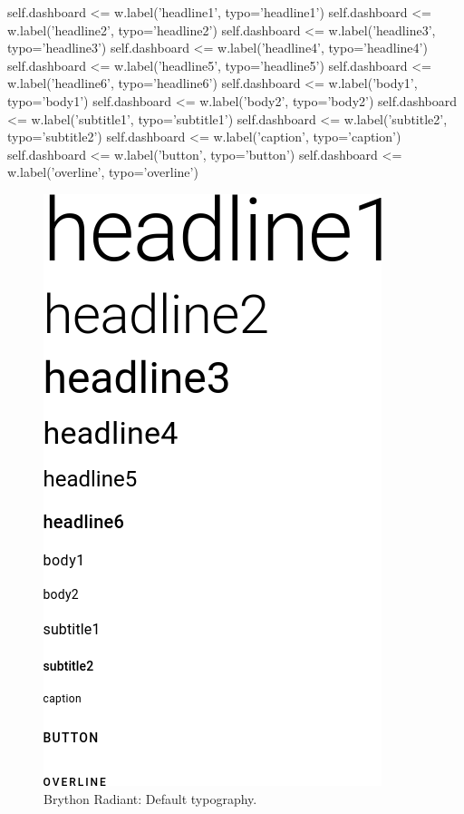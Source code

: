 \begin{python}
self.dashboard <= w.label('headline1', typo='headline1')
self.dashboard <= w.label('headline2', typo='headline2')
self.dashboard <= w.label('headline3', typo='headline3')
self.dashboard <= w.label('headline4', typo='headline4')
self.dashboard <= w.label('headline5', typo='headline5')
self.dashboard <= w.label('headline6', typo='headline6')
self.dashboard <= w.label('body1', typo='body1')
self.dashboard <= w.label('body2', typo='body2')
self.dashboard <= w.label('subtitle1', typo='subtitle1')
self.dashboard <= w.label('subtitle2', typo='subtitle2')
self.dashboard <= w.label('caption', typo='caption')
self.dashboard <= w.label('button', typo='button')
self.dashboard <= w.label('overline', typo='overline')
\end{python}

\begin{figure}[H]
\begin{centering}
\includegraphics[scale=0.5]{Cap4/Figures/widgets/typography.png}
\par\end{centering}
\caption[Brython Radiant: Typography]{Brython Radiant: Default typography.}
\label{fig:radiant_typography}
\end{figure}